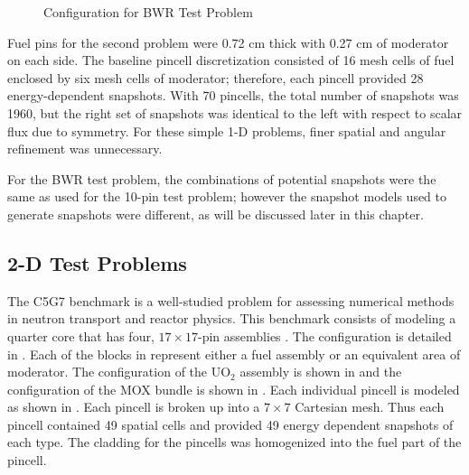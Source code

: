 \begin{figure*}[htb]
    \begin{minipage}[c]{\textwidth}
        \centering
        \vspace*{.15cm}
    \end{minipage}
    \caption{Configuration for BWR Test Problem}
    \label{fig:BWRconfig}
\end{figure*}  

Fuel pins for the second problem were 0.72 cm thick with 0.27 cm of moderator 
on each side. The baseline pincell discretization consisted of 16 mesh cells of 
fuel enclosed by six mesh cells of moderator; therefore, each pincell provided 
28 energy-dependent snapshots. With 70 pincells, the total number of snapshots 
was 1960, but the right set of snapshots was identical to the left with respect 
to scalar flux due to symmetry.  For these simple 1-D problems, finer spatial and angular 
refinement was unnecessary.

For the BWR test problem, the combinations of potential 
snapshots were the same as used for the 10-pin test problem; however the snapshot models 
used to 
generate snapshots were different, as will be discussed later in this chapter.

\subsection{2-D Test Problems}

The C5G7 benchmark is a well-studied problem for assessing numerical methods in 
neutron transport and reactor physics. This benchmark consists of modeling a 
quarter core that has four, $17\times17$-pin 
assemblies \citep{C5G7}.  The configuration is detailed in  
.  Each of the blocks in  
represent either a fuel assembly or an equivalent area of 
moderator.  The configuration of the UO$_2$ assembly is shown in  
 and the configuration of the MOX bundle is shown in  
.  Each individual pincell is modeled as shown in  
. Each pincell is broken up into a $7\times7$ 
Cartesian 
mesh. Thus each pincell contained 49 spatial cells and provided 49 energy 
dependent snapshots of each type.  The cladding for the pincells was 
homogenized into the fuel part of the pincell.  

